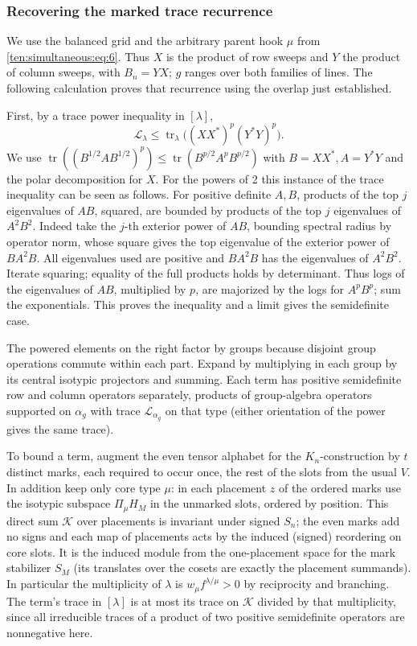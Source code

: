\subsubsection{Recovering the marked trace recurrence}

We use the balanced grid and the arbitrary parent hook $\mu$ from
\eqref{ten:simultaneous:eq:6}. Thus $X$ is the product of row sweeps
and $Y$ the product of column sweeps, with $B_n=YX$; $g$ ranges over
both families of lines. The following calculation proves that recurrence
using the overlap just established.

First, by a trace power inequality in \([\lambda]\),
\[
 \mathcal L_\lambda\le
 \operatorname{tr}_\lambda\big((XX^*)^p (Y^*Y)^p\big).
\]
We use \(\operatorname{tr}((B^{1/2} A B^{1/2})^p)\le\operatorname{tr}(B^{p/2} A^p B^{p/2})\) with \(B=XX^*, A=Y^*Y\) and the polar decomposition for \(X\). For the powers of 2 this instance of the trace inequality can be seen as follows. For positive definite \(A,B\), products of the top \(j\) eigenvalues of \(AB\), squared, are bounded by products of the top \(j\) eigenvalues of \(A^2 B^2\). Indeed take the \(j\)-th exterior power of \(AB\), bounding spectral radius by operator norm, whose square gives the top eigenvalue of the exterior power of \(B A^2 B\). All eigenvalues used are positive and \(B A^2 B\) has the eigenvalues of \(A^2 B^2\). Iterate squaring; equality of the full products holds by determinant. Thus logs of the eigenvalues of \(AB\), multiplied by \(p\), are majorized by the logs for \(A^pB^p\); sum the exponentials. This proves the inequality and a limit gives the semidefinite case.

The powered elements on the right factor by groups because disjoint group operations commute within each part. Expand by multiplying in each group by its central isotypic projectors and summing. Each term has positive semidefinite row and column operators separately, products of group-algebra operators supported on \(\alpha_g\) with trace \(\mathcal L_{\alpha_g}\) on that type (either orientation of the power gives the same trace).

To bound a term, augment the even tensor alphabet for the \(K_n\)-construction by \(t\) distinct marks, each required to occur once, the rest of the slots from the usual \(V\). In addition keep only core type \(\mu\): in each placement \(z\) of the ordered marks use the isotypic subspace \(\Pi_\mu H_M\) in the unmarked slots, ordered by position. This direct sum \(\mathcal K\) over placements is invariant under signed \(S_n\); the even marks add no signs and each map of placements acts by the induced (signed) reordering on core slots. It is the induced module from the one-placement space for the mark stabilizer \(S_M\) (its translates over the cosets are exactly the placement summands). In particular the multiplicity of \(\lambda\) is \(w_\mu f^{\lambda/\mu}>0\) by reciprocity and branching. The term's trace in \([\lambda]\) is at most its trace on \(\mathcal K\) divided by that multiplicity, since all irreducible traces of a product of two positive semidefinite operators are nonnegative here.

